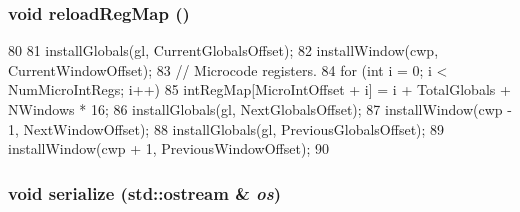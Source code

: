 \hypertarget{classSparcISA_1_1ISA_a3425c21bb9f49c5ebcd3cddc2d1ec247}{
\subsubsection[{reloadRegMap}]{\setlength{\rightskip}{0pt plus 5cm}void reloadRegMap ()}}
\label{classSparcISA_1_1ISA_a3425c21bb9f49c5ebcd3cddc2d1ec247}



\begin{DoxyCode}
80 {
81     installGlobals(gl, CurrentGlobalsOffset);
82     installWindow(cwp, CurrentWindowOffset);
83     // Microcode registers.
84     for (int i = 0; i < NumMicroIntRegs; i++)
85         intRegMap[MicroIntOffset + i] = i + TotalGlobals + NWindows * 16;
86     installGlobals(gl, NextGlobalsOffset);
87     installWindow(cwp - 1, NextWindowOffset);
88     installGlobals(gl, PreviousGlobalsOffset);
89     installWindow(cwp + 1, PreviousWindowOffset);
90 }
\end{DoxyCode}
\hypertarget{classSparcISA_1_1ISA_a53e036786d17361be4c7320d39c99b84}{
\subsubsection[{serialize}]{\setlength{\rightskip}{0pt plus 5cm}void serialize (std::ostream \& {\em os})}}
\label{classSparcISA_1_1ISA_a53e036786d17361be4c7320d39c99b84}



